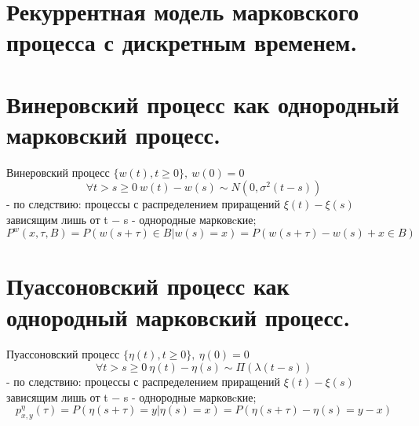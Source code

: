 \documentclass[11pt]{article}
\begin{document}
\section{Рекуррентная модель марковского процесса с дискретным временем.}


\section{Винеровский процесс как однородный марковский процесс.}
Винеровский процесс $\{w(t), t \geq 0\}, \ w(0) = 0$
$$ \forall t > s \geq 0 \ w(t)−w(s) ∼ N(0,\sigma^2(t−s))$$ - по следствию: процессы с распределением приращений $\xi(t) − \xi(s)$ зависящим лишь от t − s - однородные марковcкие; \\
$$ P^w(x,\tau,B) = P(w(s+\tau)\in B | w(s)=x) = P(w(s+\tau)−w(s)+x\in B)$$

\section{Пуассоновский процесс как однородный марковский процесс.}
Пуассоновский процесс $\{\eta(t), t \geq 0\}, \ \eta(0) = 0$
$$ \forall t > s \geq 0 \ \eta(t)−\eta(s) ∼ \Pi(\lambda(t−s))$$ - по следствию: процессы с распределением приращений $\xi(t) − \xi(s)$ зависящим лишь от t − s - однородные марковcкие; \\
$$ p_{x,y}^\eta (\tau) = P(\eta(s + \tau ) = y | \eta(s) = x) = P(\eta(s + \tau) − \eta(s) = y − x)$$
\end{document}
